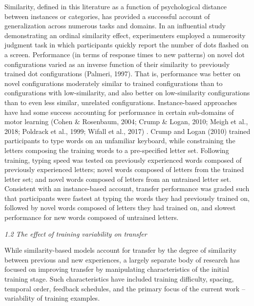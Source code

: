 \documentclass[
  man,floatsintext]{apa7}
\begin{document}
Similarity, defined in this literature as a function of psychological distance between instances or categories, has provided a successful account of generalization across numerous tasks and domains. In an influential study demonstrating an ordinal similarity effect, experimenters employed a numerosity judgment task in which participants quickly report the number of dots flashed on a screen. Performance (in terms of response times to new patterns) on novel dot configurations varied as an inverse function of their similarity to previously trained dot configurations (Palmeri, 1997). That is, performance was better on novel configurations moderately similar to trained configurations than to configurations with low-similarity, and also better on low-similarity configurations than to even less similar, unrelated configurations. Instance-based approaches have had some success accounting for performance in certain sub-domains of motor learning (Cohen \& Rosenbaum, 2004; Crump \& Logan, 2010; Meigh et al., 2018; Poldrack et al., 1999; Wifall et al., 2017) . Crump and Logan (2010) trained participants to type words on an unfamiliar keyboard, while constraining the letters composing the training words to a pre-specified letter set. Following training, typing speed was tested on previously experienced words composed of previously experienced letters; novel words composed of letters from the trained letter set; and novel words composed of letters from an untrained letter set. Consistent with an instance-based account, transfer performance was graded such that participants were fastest at typing the words they had previously trained on, followed by novel words composed of letters they had trained on, and slowest performance for new words composed of untrained letters.

\emph{1.2 The effect of training variability on transfer}

While similarity-based models account for transfer by the degree of similarity between previous and new experiences, a largely separate body of research has focused on improving transfer by manipulating characteristics of the initial training stage. Such characteristics have included training difficulty, spacing, temporal order, feedback schedules, and the primary focus of the current work -- variability of training examples.
\end{document}
